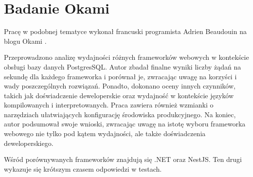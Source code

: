 \section{Badanie Okami}
Pracę w podobnej tematyce wykonał francuski programista Adrien Beaudouin na blogu Okami \cite{okami1012024Benchmark}.

Przeprowadzono analizę wydajności różnych frameworków webowych w kontekście obsługi bazy danych PostgresSQL.
Autor zbadał finalne wyniki liczby żądań na sekundę dla każdego frameworka i porównał je, zwracając uwagę na korzyści i wady poszczególnych rozwiązań. 
Ponadto, dokonano oceny innych czynników, takich jak doświadczenie deweloperskie oraz wydajność w kontekście języków kompilowanych i interpretowanych.
Praca zawiera również wzmianki o narzędziach ułatwiających konfigurację środowiska produkcyjnego.
Na koniec, autor podsumował swoje wnioski, zwracając uwagę na istotę wyboru frameworka webowego nie tylko pod kątem wydajności, ale także doświadczenia deweloperskiego.

Wśród porównywanych frameworków znajdują się .NET oraz NestJS.
Ten drugi wykazuje się krótszym czasem odpowiedzi w testach.